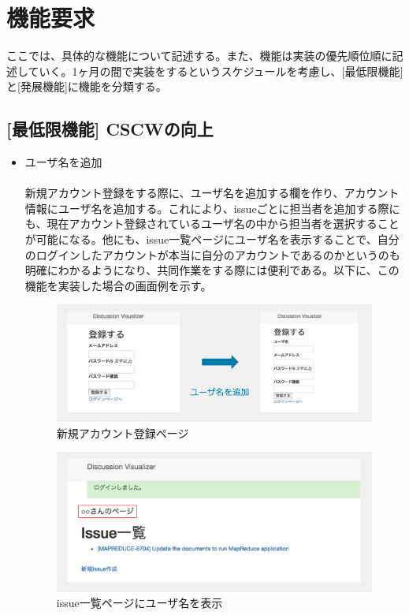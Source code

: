 \documentclass[12pt, oneside]{jreport}
\begin{document}
	
	\section{機能要求}
	ここでは、具体的な機能について記述する。また、機能は実装の優先順位順に記述していく。1ヶ月の間で実装をするというスケジュールを考慮し、[最低限機能]と[発展機能]に機能を分類する。
	
		\subsection{[最低限機能] CSCWの向上}
		\begin{itemize}
			\item ユーザ名を追加
			\\ \\
			新規アカウント登録をする際に、ユーザ名を追加する欄を作り、アカウント情報にユーザ名を追加する。これにより、issueごとに担当者を追加する際にも、現在アカウント登録されているユーザ名の中から担当者を選択することが可能になる。他にも、issue一覧ページにユーザ名を表示することで、自分のログインしたアカウントが本当に自分のアカウントであるのかというのも明確にわかるようになり、共同作業をする際には便利である。以下に、この機能を実装した場合の画面例を示す。
			
			\begin{figure}[H]
			\centering
			\includegraphics[width=17cm,bb=520 300 -200 27]{UserName1.png}
			\caption{新規アカウント登録ページ}
			\end{figure}
			
			\begin{figure}[H]
			\centering
			\includegraphics[width=17cm,bb=470 300 -200 27]{UserName2.png}
			\caption{issue一覧ページにユーザ名を表示}
			\end{figure}
		

\end{itemize}
\end{document}
